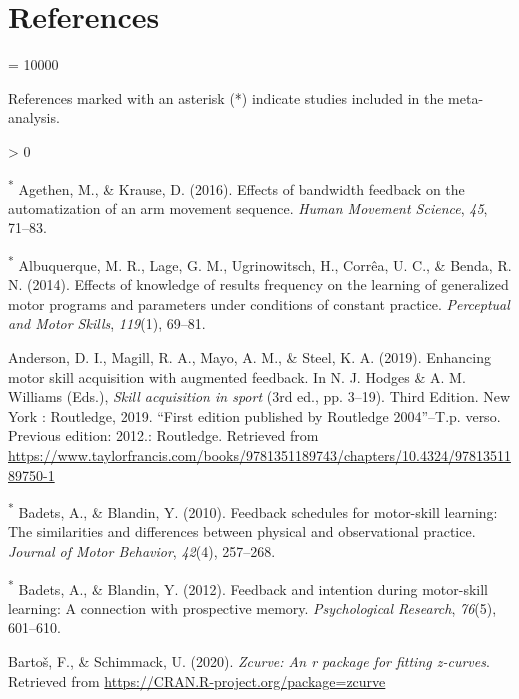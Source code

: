 \documentclass[
  english,
  man,mask,floatsintext]{apa7}
\newlength{\cslhangindent}
\newenvironment{CSLReferences}[2] %
 {%
  \setlength{\parindent}{0pt}
  \ifodd #1 \everypar{\setlength{\hangindent}{\cslhangindent}}\ignorespaces\fi
  \ifnum #2 > 0
  \setlength{\parskip}{#2\baselineskip}
  \fi
 }%
 {}
\begin{document}
\hypertarget{references}{%
\section{References}\label{references}}

\begingroup
\interlinepenalty = 10000
\setlength{\parindent}{-0.5in}
\setlength{\leftskip}{0.5in}

References marked with an asterisk (*) indicate studies included in the meta-analysis.

\endgroup

\hypertarget{refs}{}
\begin{CSLReferences}{1}{0}
\leavevmode\hypertarget{ref-Agethen2016}{}%
\textsuperscript{*} Agethen, M., \& Krause, D. (2016). Effects of bandwidth feedback on the automatization of an arm movement sequence. \emph{Human Movement Science}, \emph{45}, 71--83.

\leavevmode\hypertarget{ref-Albuquerque2014}{}%
\textsuperscript{*} Albuquerque, M. R., Lage, G. M., Ugrinowitsch, H., Corrêa, U. C., \& Benda, R. N. (2014). Effects of knowledge of results frequency on the learning of generalized motor programs and parameters under conditions of constant practice. \emph{Perceptual and Motor Skills}, \emph{119}(1), 69--81.

\leavevmode\hypertarget{ref-Anderson2019}{}%
Anderson, D. I., Magill, R. A., Mayo, A. M., \& Steel, K. A. (2019). Enhancing motor skill acquisition with augmented feedback. In N. J. Hodges \& A. M. Williams (Eds.), \emph{Skill acquisition in sport} (3rd ed., pp. 3--19). Third Edition. {{}} New York : Routledge, 2019. {{}} {``First edition published by Routledge 2004''}--T.p. verso. {{}} Previous edition: 2012.: Routledge. Retrieved from \url{https://www.taylorfrancis.com/books/9781351189743/chapters/10.4324/9781351189750-1}

\leavevmode\hypertarget{ref-Badets2010}{}%
\textsuperscript{*} Badets, A., \& Blandin, Y. (2010). Feedback schedules for motor-skill learning: The similarities and differences between physical and observational practice. \emph{Journal of Motor Behavior}, \emph{42}(4), 257--268.

\leavevmode\hypertarget{ref-Badets2012}{}%
\textsuperscript{*} Badets, A., \& Blandin, Y. (2012). Feedback and intention during motor-skill learning: A connection with prospective memory. \emph{Psychological Research}, \emph{76}(5), 601--610.

\leavevmode\hypertarget{ref-Bartoux1612020}{}%
Bartoš, F., \& Schimmack, U. (2020). \emph{Zcurve: An r package for fitting z-curves}. Retrieved from \url{https://CRAN.R-project.org/package=zcurve}


\end{CSLReferences}
\end{document}
